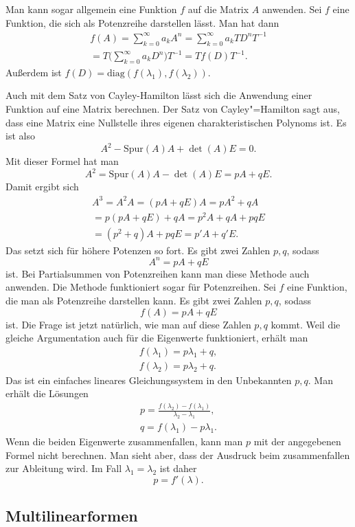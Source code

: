 \documentclass[a4paper,10pt,fleqn,twocolumn,twoside]{article}
\begin{document}
Man kann sogar allgemein eine Funktion $f$ auf die Matrix $A$
anwenden. Sei $f$ eine Funktion, die sich als Potenzreihe
darstellen lässt. Man hat dann
\begin{gather*}
f(A) = \sum_{k=0}^{\infty} a_kA^n
= \sum_{k=0}^{\infty} a_kTD^nT^{-1}\\
= T\Big(\sum_{k=0}^{\infty} a_kD^n\Big)T^{-1}
= Tf(D)T^{-1}.
\end{gather*}
Außerdem ist $f(D)=\mathrm{diag}(f(\lambda_1),f(\lambda_2))$.

Auch mit dem Satz von Cayley-Hamilton lässt sich die Anwendung
einer Funktion auf eine Matrix berechnen. Der Satz von
Cayley"=Hamilton sagt aus, dass eine Matrix eine Nullstelle ihres
eigenen charakteristischen Polynoms ist. Es ist also
\[A^2 -\mathrm{Spur}(A)A+\det(A)E=0.\]
Mit dieser Formel hat man
\[A^2 =\mathrm{Spur}(A)A-\det(A)E = pA+qE.\]
Damit ergibt sich
\begin{gather*}
A^3 = A^2A = (pA+qE)A = pA^2+qA\\
= p(pA+qE)+qA = p^{2}A+qA+pqE\\
= (p^2+q)A+pqE = p'A+q'E.
\end{gather*}
Das setzt sich für höhere Potenzen so fort.
Es gibt zwei Zahlen $p,q$, sodass
\[A^n = pA+qE\]
ist. Bei Partialsummen von Potenzreihen kann man diese Methode
auch anwenden. Die Methode funktioniert sogar für Potenzreihen.
Sei $f$ eine Funktion, die man als Potenzreihe darstellen kann.
Es gibt zwei Zahlen $p,q$, sodass
\[f(A) = pA+qE\]
ist. Die Frage ist jetzt natürlich, wie man auf diese Zahlen $p,q$
kommt. Weil die gleiche Argumentation auch für die Eigenwerte
funktioniert, erhält man
\begin{gather*}
f(\lambda_1) = p\lambda_1+q,\\
f(\lambda_2) = p\lambda_2+q.
\end{gather*}
Das ist ein einfaches lineares Gleichungssystem in den Unbekannten
$p,q$. Man erhält die Lösungen
\begin{gather*}
p = \frac{f(\lambda_2)-f(\lambda_1)}{\lambda_2-\lambda_1},\\
q = f(\lambda_1)-p\lambda_1.
\end{gather*}
Wenn die beiden Eigenwerte zusammenfallen, kann man $p$ mit der
angegebenen Formel nicht berechnen. Man sieht aber, dass der Ausdruck
beim zusammenfallen zur Ableitung wird. Im Fall
$\lambda_1=\lambda_2$ ist daher
\[p = f'(\lambda).\]

\subsection{Multilinearformen}
\end{document}
